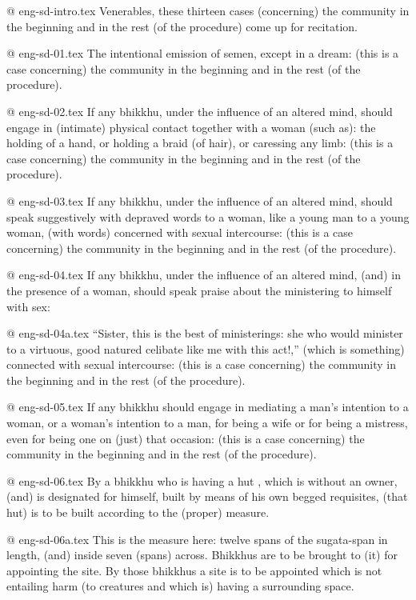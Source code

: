 @ eng-sd-intro.tex
Venerables, these thirteen cases (concerning) the community in the beginning and in the rest (of the procedure) come up for recitation.

@ eng-sd-01.tex
The intentional emission of semen, except in a dream: (this is a case concerning) the community in the beginning and in the rest (of the procedure).

@ eng-sd-02.tex
If any bhikkhu, under the influence of an altered mind, should engage in (intimate) physical contact together with a woman (such as): the holding of a hand, or holding a braid (of hair), or caressing any limb: (this is a case concerning) the community in the beginning and in the rest (of the procedure).

@ eng-sd-03.tex
If any bhikkhu, under the influence of an altered mind, should speak suggestively with depraved words to a woman, like a young man to a young woman, (with words) concerned with sexual intercourse: (this is a case concerning) the community in the beginning and in the rest (of the procedure).

@ eng-sd-04.tex
If any bhikkhu, under the influence of an altered mind, (and) in the presence of a woman, should speak praise about the ministering to himself with sex:

@ eng-sd-04a.tex
“Sister, this is the best of ministerings: she who would minister to a virtuous, good natured celibate like me with this act!,” (which is something) connected with sexual intercourse: (this is a case concerning) the community in the beginning and in the rest (of the procedure).

@ eng-sd-05.tex
If any bhikkhu should engage in mediating a man's intention to a woman, or a woman's intention to a man, for being a wife or for being a mistress, even for being one on (just) that occasion: (this is a case concerning) the community in the beginning and in the rest (of the procedure).

@ eng-sd-06.tex
By a bhikkhu who is having a hut , which is without an owner, (and) is designated for himself, built by means of his own begged requisites, (that hut) is to be built according to the (proper) measure. 

@ eng-sd-06a.tex
This is the measure here: twelve spans of the sugata-span in length, (and) inside seven (spans) across. Bhikkhus are to be brought to (it) for appointing the site. By those bhikkhus a site is to be appointed which is not entailing harm (to creatures and which is) having a surrounding space.

